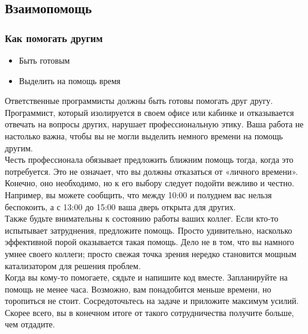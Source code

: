 \documentclass{../industrial-development}
\begin{document}
\subsection{Взаимопомощь}
\begin{frame} \frametitle{Как помогать другим}
\begin{itemize}
  \item Быть готовым
  \item Выделить на помощь время
\end{itemize}
\end{frame}
\lecturenotes
Ответственные программисты должны быть готовы помогать друг другу. Программист, который изолируется в своем офисе или кабинке и отказывается отвечать на вопросы других, нарушает профессиональную этику. Ваша работа не настолько важна, чтобы вы не могли выделить немного времени на помощь другим.\\
Честь профессионала обязывает предложить ближним помощь тогда, когда это потребуется. Это не означает, что вы должны отказаться от «личного времени». Конечно, оно необходимо, но к его выбору следует подойти вежливо и честно. Например, вы можете сообщить, что между 10:00 и полуднем вас нельзя беспокоить, а с 13:00 до 15:00 ваша дверь открыта для других.\\
Также будьте внимательны к состоянию работы ваших коллег. Если кто-то испытывает затруднения, предложите помощь. Просто удивительно, насколько эффективной порой оказывается такая помощь. Дело не в том, что вы намного умнее своего коллеги; просто свежая точка зрения нередко становится мощным катализатором для решения проблем.\\
Когда вы кому-то помогаете, сядьте и напишите код вместе. Запланируйте на помощь не менее часа. Возможно, вам понадобится меньше времени, но торопиться не стоит. Сосредоточьтесь на задаче и приложите максимум усилий. Скорее всего, вы в конечном итоге от такого сотрудничества получите больше, чем отдадите.
\end{document}
